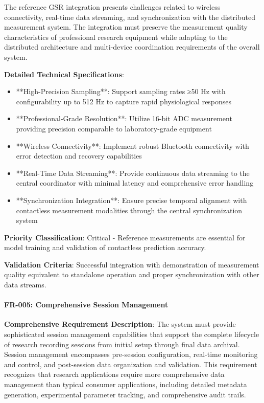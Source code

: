 \documentclass[12pt,a4paper]{report}
\begin{document}
The reference GSR integration presents challenges related to wireless connectivity, real-time data streaming, and
synchronization with the distributed measurement system. The integration must preserve the measurement quality
characteristics of professional research equipment while adapting to the distributed architecture and multi-device
coordination requirements of the overall system.

\textbf{Detailed Technical Specifications}:

\begin{itemize}
\item **High-Precision Sampling**: Support sampling rates ≥50 Hz with configurability up to 512 Hz to capture rapid
  physiological responses
\item **Professional-Grade Resolution**: Utilize 16-bit ADC measurement providing precision comparable to laboratory-grade
  equipment
\item **Wireless Connectivity**: Implement robust Bluetooth connectivity with error detection and recovery capabilities
\item **Real-Time Data Streaming**: Provide continuous data streaming to the central coordinator with minimal latency and
  comprehensive error handling
\item **Synchronization Integration**: Ensure precise temporal alignment with contactless measurement modalities through the
  central synchronization system

\end{itemize}
\textbf{Priority Classification}: Critical - Reference measurements are essential for model training and validation of
contactless prediction accuracy.

\textbf{Validation Criteria}: Successful integration with demonstration of measurement quality equivalent to standalone
operation and proper synchronization with other data streams.

\paragraph{FR-005: Comprehensive Session Management}

\textbf{Comprehensive Requirement Description}: The system must provide sophisticated session management capabilities that
support the complete lifecycle of research recording sessions from initial setup through final data archival. Session
management encompasses pre-session configuration, real-time monitoring and control, and post-session data organization
and validation. This requirement recognizes that research applications require more comprehensive data management than
typical consumer applications, including detailed metadata generation, experimental parameter tracking, and
comprehensive audit trails.
\end{document}
